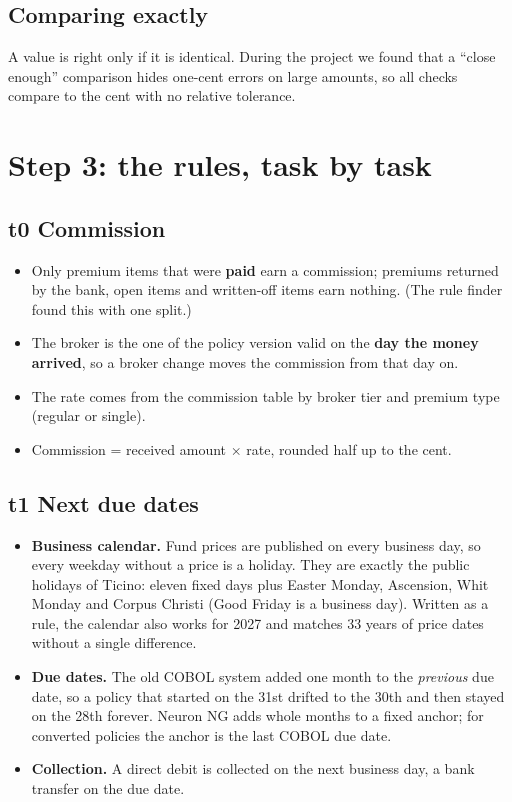 \documentclass[11pt,a4paper]{article}
\begin{document}
\subsection{Comparing exactly}
A value is right only if it is identical. During the project we found that a ``close enough'' comparison hides
one-cent errors on large amounts, so all checks compare to the cent with no relative tolerance.

\section{Step 3: the rules, task by task}

\subsection{t0 Commission}
\begin{itemize}
  \item Only premium items that were \textbf{paid} earn a commission; premiums returned by the bank, open items and
        written-off items earn nothing. (The rule finder found this with one split.)
  \item The broker is the one of the policy version valid on the \textbf{day the money arrived}, so a broker change
        moves the commission from that day on.
  \item The rate comes from the commission table by broker tier and premium type (regular or single).
  \item Commission = received amount $\times$ rate, rounded half up to the cent.
\end{itemize}

\subsection{t1 Next due dates}
\begin{itemize}
  \item \textbf{Business calendar.} Fund prices are published on every business day, so every weekday without a price
        is a holiday. They are exactly the public holidays of Ticino: eleven fixed days plus Easter Monday, Ascension,
        Whit Monday and Corpus Christi (Good Friday is a business day). Written as a rule, the calendar also works for
        2027 and matches 33 years of price dates without a single difference.
  \item \textbf{Due dates.} The old COBOL system added one month to the \emph{previous} due date, so a policy that
        started on the 31st drifted to the 30th and then stayed on the 28th forever. Neuron NG adds whole months to a
        fixed anchor; for converted policies the anchor is the last COBOL due date.
  \item \textbf{Collection.} A direct debit is collected on the next business day, a bank transfer on the due date.
\end{itemize}
\end{document}
